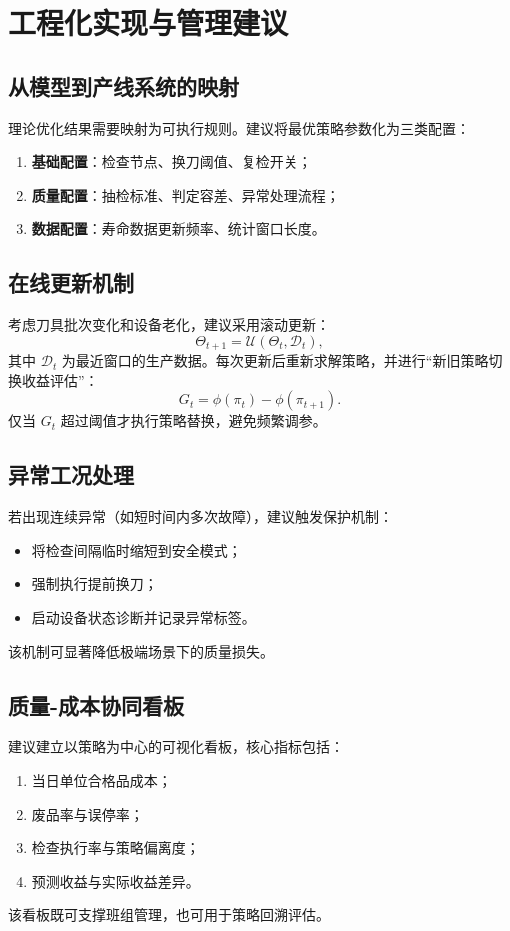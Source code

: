 \chapter{工程化实现与管理建议}

\section{从模型到产线系统的映射}
理论优化结果需要映射为可执行规则。建议将最优策略参数化为三类配置：
\begin{enumerate}
  \item \textbf{基础配置}：检查节点、换刀阈值、复检开关；
  \item \textbf{质量配置}：抽检标准、判定容差、异常处理流程；
  \item \textbf{数据配置}：寿命数据更新频率、统计窗口长度。
\end{enumerate}

\section{在线更新机制}
考虑刀具批次变化和设备老化，建议采用滚动更新：
\[
\Theta_{t+1}=\mathcal U(\Theta_t,\mathcal D_t),
\]
其中 $\mathcal D_t$ 为最近窗口的生产数据。每次更新后重新求解策略，并进行“新旧策略切换收益评估”：
\[
G_t=\phi(\pi_t)-\phi(\pi_{t+1}).
\]
仅当 $G_t$ 超过阈值才执行策略替换，避免频繁调参。

\section{异常工况处理}
若出现连续异常（如短时间内多次故障），建议触发保护机制：
\begin{itemize}
  \item 将检查间隔临时缩短到安全模式；
  \item 强制执行提前换刀；
  \item 启动设备状态诊断并记录异常标签。
\end{itemize}
该机制可显著降低极端场景下的质量损失。

\section{质量-成本协同看板}
建议建立以策略为中心的可视化看板，核心指标包括：
\begin{enumerate}
  \item 当日单位合格品成本；
  \item 废品率与误停率；
  \item 检查执行率与策略偏离度；
  \item 预测收益与实际收益差异。
\end{enumerate}
该看板既可支撑班组管理，也可用于策略回溯评估。

